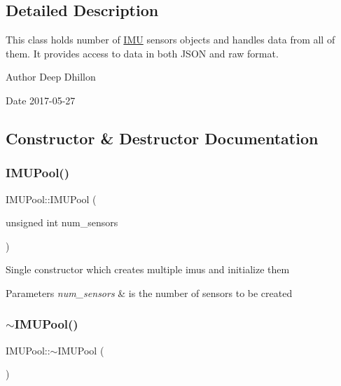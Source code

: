 \subsection{Detailed Description}
This class holds number of \hyperlink{class_i_m_u}{I\+MU} sensors\textquotesingle{} objects and handles data from all of them. It provides access to data in both J\+S\+ON and raw format. 

\begin{DoxyAuthor}{Author}
Deep Dhillon 
\end{DoxyAuthor}
\begin{DoxyDate}{Date}
2017-\/05-\/27 
\end{DoxyDate}


\subsection{Constructor \& Destructor Documentation}
\mbox{\label{class_i_m_u_pool_ab3160066458f0c69b54b6f2fce31b0e5}} 
\subsubsection{\texorpdfstring{I\+M\+U\+Pool()}{IMUPool()}}
{\footnotesize\ttfamily I\+M\+U\+Pool\+::\+I\+M\+U\+Pool (\begin{DoxyParamCaption}\item[{unsigned int}]{num\+\_\+sensors }\end{DoxyParamCaption})}

Single constructor which creates multiple imus and initialize them 
\begin{DoxyParams}{Parameters}
{\em num\+\_\+sensors} & is the number of sensors to be created \\
\hline
\end{DoxyParams}
\mbox{\label{class_i_m_u_pool_ab7e6235773fc29b6f10a61ef8822fff3}} 
\subsubsection{\texorpdfstring{$\sim$\+I\+M\+U\+Pool()}{~IMUPool()}}
{\footnotesize\ttfamily I\+M\+U\+Pool\+::$\sim$\+I\+M\+U\+Pool (\begin{DoxyParamCaption}{ }\end{DoxyParamCaption})}

